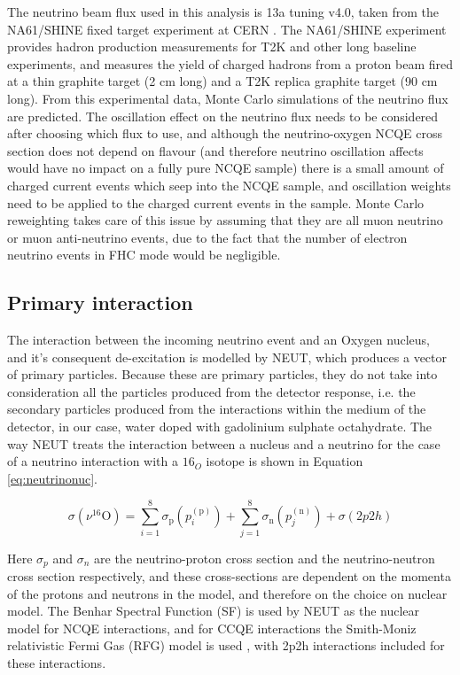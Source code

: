 The neutrino beam flux used in this analysis is 13a tuning v4.0, taken from the NA61/SHINE fixed target experiment at CERN \cite{vladisavljevic_constraining_2018}.  The NA61/SHINE experiment provides hadron production measurements for T2K and other long baseline experiments, and measures the yield of charged hadrons from a proton beam fired at a thin graphite target (2 cm long) and a T2K replica graphite target (90 cm long). From this experimental data, Monte Carlo simulations of the neutrino flux are predicted. The oscillation effect on the neutrino flux needs to be considered after choosing which flux to use, and although the neutrino-oxygen NCQE cross section does not depend on flavour (and therefore neutrino oscillation affects would have no impact on a fully pure NCQE sample) there is a small amount of charged current events which seep into the NCQE sample, and oscillation weights need to be applied to the charged current events in the sample. Monte Carlo reweighting takes care of this issue by assuming that they are all muon neutrino or muon anti-neutrino events, due to the fact that the number of electron neutrino events in FHC mode would be negligible.

\subsection{Primary interaction}

The interaction between the incoming neutrino event and an Oxygen nucleus, and it's consequent de-excitation is modelled by NEUT, which produces a vector of primary particles. Because these are primary particles, they do not take into consideration all the particles produced from the detector response, i.e. the secondary particles produced from the interactions within the medium of the detector, in our case, water doped with gadolinium sulphate octahydrate. The way NEUT treats the interaction between a nucleus and a neutrino for the case of a neutrino interaction with a $16_{O}$ isotope is shown in Equation \ref{eq:neutrinonuc}. 

\begin{equation}
    \sigma\left(\nu^{16} \mathrm{O}\right)=\sum_{i=1}^{8} \sigma_{\mathrm{p}}\left(p_{i}^{(\mathrm{p})}\right)+\sum_{j=1}^{8} \sigma_{\mathrm{n}}\left(p_{j}^{(\mathrm{n})}\right)+\sigma(2 p 2 h)    
\label{eq:neutrinonuc}    
\end{equation}

Here $\sigma_{p}$ and $\sigma_{n}$ are the neutrino-proton cross section and the neutrino-neutron cross section respectively, and these cross-sections are dependent on the momenta of the protons and neutrons in the model, and therefore on the choice on nuclear model. The Benhar Spectral Function (SF) is used by NEUT as the nuclear model for NCQE interactions, and for CCQE interactions the Smith-Moniz relativistic Fermi Gas (RFG) model is used \cite{benhar_electron-_2005}, with 2p2h interactions included for these interactions. 

